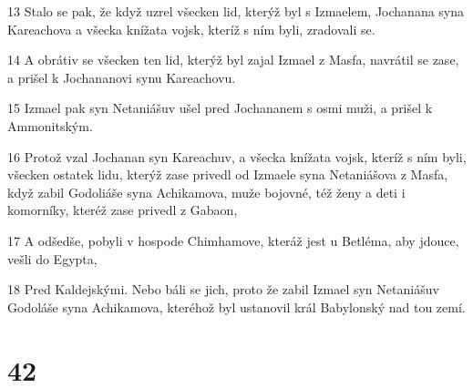 \par 13 Stalo se pak, že když uzrel všecken lid, kterýž byl s Izmaelem, Jochanana syna Kareachova a všecka knížata vojsk, kteríž s ním byli, zradovali se.
\par 14 A obrátiv se všecken ten lid, kterýž byl zajal Izmael z Masfa, navrátil se zase, a prišel k Jochananovi synu Kareachovu.
\par 15 Izmael pak syn Netaniášuv ušel pred Jochananem s osmi muži, a prišel k Ammonitským.
\par 16 Protož vzal Jochanan syn Kareachuv, a všecka knížata vojsk, kteríž s ním byli, všecken ostatek lidu, kterýž zase privedl od Izmaele syna Netaniášova z Masfa, když zabil Godoliáše syna Achikamova, muže bojovné, též ženy a deti i komorníky, kteréž zase privedl z Gabaon,
\par 17 A odšedše, pobyli v hospode Chimhamove, kteráž jest u Betléma, aby jdouce, vešli do Egypta,
\par 18 Pred Kaldejskými. Nebo báli se jich, proto že zabil Izmael syn Netaniášuv Godoláše syna Achikamova, kteréhož byl ustanovil král Babylonský nad tou zemí.

\chapter{42}

